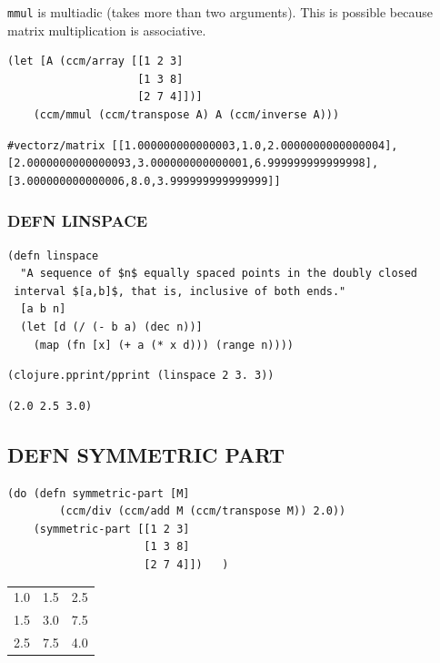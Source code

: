 \documentclass[10pt,oneside,x11names]{article}
\begin{document}
\texttt{mmul} is multiadic (takes more than two arguments). This is possible
because matrix multiplication is associative.

\begin{verbatim}
(let [A (ccm/array [[1 2 3]
                    [1 3 8]
                    [2 7 4]])]
    (ccm/mmul (ccm/transpose A) A (ccm/inverse A)))
\end{verbatim}

\begin{verbatim}
#vectorz/matrix [[1.000000000000003,1.0,2.0000000000000004],
[2.0000000000000093,3.000000000000001,6.999999999999998],
[3.000000000000006,8.0,3.999999999999999]]
\end{verbatim}

\subsubsection{DEFN LINSPACE}
\label{linspace}
\begin{verbatim}
(defn linspace
  "A sequence of $n$ equally spaced points in the doubly closed
 interval $[a,b]$, that is, inclusive of both ends."
  [a b n]
  (let [d (/ (- b a) (dec n))]
    (map (fn [x] (+ a (* x d))) (range n))))
\end{verbatim}

\begin{verbatim}
(clojure.pprint/pprint (linspace 2 3. 3))
\end{verbatim}

\begin{verbatim}
(2.0 2.5 3.0)
\end{verbatim}

\subsection{DEFN SYMMETRIC PART}
\label{sec:org4dea6cb}

\begin{verbatim}
(do (defn symmetric-part [M]
        (ccm/div (ccm/add M (ccm/transpose M)) 2.0))
    (symmetric-part [[1 2 3]
                     [1 3 8]
                     [2 7 4]])   )
\end{verbatim}

\begin{center}
\begin{tabular}{rrr}
1.0 & 1.5 & 2.5\\
1.5 & 3.0 & 7.5\\
2.5 & 7.5 & 4.0\\
\end{tabular}
\end{center}
\end{document}
